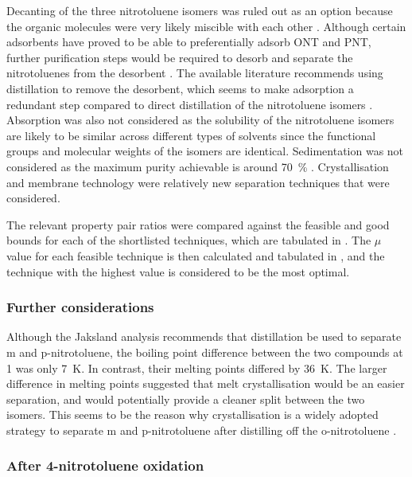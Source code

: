 Decanting of the three nitrotoluene isomers was ruled out as an option because the organic molecules were very likely miscible with each other \cite{merck_solvent_2021}. Although certain adsorbents have proved to be able to preferentially adsorb ONT and PNT, further purification steps would be required to desorb and separate the nitrotoluenes from the desorbent \cite{zhao_new_2016}. The available literature recommends using distillation to remove the desorbent, which seems to make adsorption a redundant step compared to direct distillation of the nitrotoluene isomers \cite{zinnen_ep0181106a2_1984}. Absorption was also not considered as the solubility of the nitrotoluene isomers are likely to be similar across different types of solvents since the functional groups and molecular weights of the isomers are identical. Sedimentation was not considered as the maximum purity achievable is around \SI{70}{\percent} \cite{seider_product_2009}. Crystallisation and membrane technology were relatively new separation techniques that were considered. 

The relevant property pair ratios were compared against the feasible and good bounds for each of the shortlisted techniques, which are tabulated in . The $\mu$ value for each feasible technique is then calculated and tabulated in , and the technique with the highest value is considered to be the most optimal. 

\subsubsection{Further considerations}
Although the Jaksland analysis recommends that distillation be used to separate m and p-nitrotoluene, the boiling point difference between the two compounds at \SI{1}{\atm} was only \SI{7}{\K}. In contrast, their melting points differed by \SI{36}{\K}. The larger difference in melting points suggested that melt crystallisation would be an easier separation, and would potentially provide a cleaner split between the two isomers. This seems to be the reason why crystallisation is a widely adopted strategy to separate m and p-nitrotoluene after distilling off the o-nitrotoluene \cite{weiland_purification_1931,european_chemical_agency_background_2010}. 


\subsubsection{After 4-nitrotoluene oxidation}

